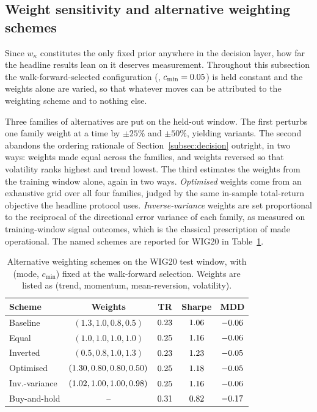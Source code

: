 \subsection{Weight sensitivity and alternative weighting schemes}\label{subsec:weights}

Since $w_\kappa$ constitutes the only fixed prior anywhere in the decision layer, how far the headline results lean on it deserves measurement. Throughout this subsection the walk-forward-selected configuration (\BestMode{}, $c_{\min} = 0.05{}$) is held constant and the weights alone are varied, so that whatever moves can be attributed to the weighting scheme and to nothing else.

Three families of alternatives are put on the held-out window. The first perturbs one family weight at a time by $\pm 25\%$ and $\pm 50\%$, yielding \WSPerturbN{} variants. The second abandons the ordering rationale of Section~\ref{subsec:decision} outright, in two ways: weights made equal across the families, and weights reversed so that volatility ranks highest and trend lowest. The third estimates the weights from the training window alone, again in two ways. \emph{Optimised} weights come from an exhaustive grid over all four families, judged by the same in-sample total-return objective the headline protocol uses. \emph{Inverse-variance} weights are set proportional to the reciprocal of the directional error variance of each family, as measured on training-window signal outcomes, which is the classical prescription of \cite{batesgranger1969} made operational. The named schemes are reported for WIG20 in Table~\ref{tab:weights}.

\begin{table}[!htbp]
\centering
\small
\caption{Alternative weighting schemes on the WIG20 test window, with (mode, $c_{\min}$) fixed at the walk-forward selection. Weights are listed as (trend, momentum, mean-reversion, volatility).}
\label{tab:weights}
\begin{tabular}{lcccc}
\toprule
\textbf{Scheme} & \textbf{Weights} & \textbf{TR} & \textbf{Sharpe} & \textbf{MDD} \\
\midrule
Baseline & $(1.3, 1.0, 0.8, 0.5)$ & $0.23$ & $1.06$ & $-0.06$ \\
Equal & $(1.0, 1.0, 1.0, 1.0)$ & $0.25$ & $1.16$ & $-0.06$ \\
Inverted & $(0.5, 0.8, 1.0, 1.3)$ & $0.23$ & $1.23$ & $-0.05$ \\
Optimised & $(1.30, 0.80, 0.80, 0.50)$ & $0.25$ & $1.18$ & $-0.05$ \\
Inv.-variance & $(1.02, 1.00, 1.00, 0.98)$ & $0.25$ & $1.16$ & $-0.06$ \\
Buy-and-hold & -- & $0.31$ & $0.82$ & $-0.17$ \\
\bottomrule
\end{tabular}
\end{table}

